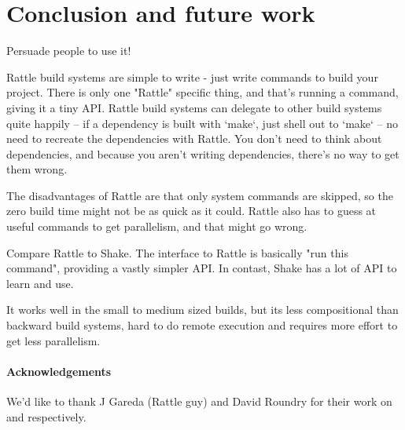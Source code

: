\section{Conclusion and future work}
\label{sec:conclusion}

Persuade people to use it!

Rattle build systems are simple to write - just write commands to build your project. There is only one "Rattle" specific thing, and that's running a command, giving it a tiny API. Rattle build systems can delegate to other build systems quite happily -- if a dependency is built with `make`, just shell out to `make` -- no need to recreate the dependencies with Rattle. You don't need to think about dependencies, and because you aren't writing dependencies, there's no way to get them wrong.

The disadvantages of Rattle are that only system commands are skipped, so the zero build time might not be as quick as it could. Rattle also has to guess at useful commands to get parallelism, and that might go wrong.

Compare Rattle to Shake. The interface to Rattle is basically "run this command", providing a vastly simpler API. In contast, Shake has a lot of API to learn and use.

It works well in the small to medium sized builds, but its less compositional than backward build systems, hard to do remote execution and requires more effort to get less parallelism.

\paragraph{Acknowledgements} We'd like to thank J Gareda (Rattle guy) and David Roundry for their work on \Fsatrace and \libbigbro respectively.
